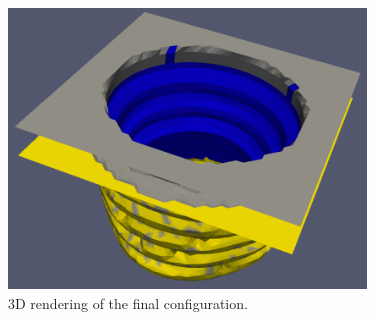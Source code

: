 \documentclass[12pt,a4paper]{article}
\begin{document}
 \begin{figure}[H]
	\centering \includegraphics[width=9.5cm]{figures/3D_optimal_dir.png}
	\caption{3D rendering of the final configuration.} 
    \label{fig:3D}
\end{figure}
\end{document}
